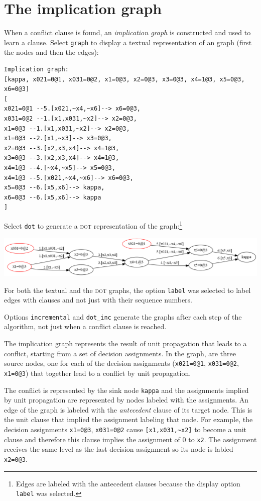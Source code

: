 \documentclass[11pt]{article}
\newcommand*{\p}[1]{\textup{\texttt{#1}}}
\newcommand*{\dt}{\textsc{dot}}
\begin{document}
\clearpage

\section{The implication graph}

When a conflict clause is found, an \emph{implication graph} is
constructed and used to learn a clause. Select \p{graph} to display a
textual representation of an graph (first the nodes and then the edges):
\begin{verbatim}
Implication graph:
[kappa, x021=0@1, x031=0@2, x1=0@3, x2=0@3, x3=0@3, x4=1@3, x5=0@3, x6=0@3]
[
x021=0@1 --5.[x021,~x4,~x6]--> x6=0@3,
x031=0@2 --1.[x1,x031,~x2]--> x2=0@3,
x1=0@3 --1.[x1,x031,~x2]--> x2=0@3,
x1=0@3 --2.[x1,~x3]--> x3=0@3,
x2=0@3 --3.[x2,x3,x4]--> x4=1@3,
x3=0@3 --3.[x2,x3,x4]--> x4=1@3,
x4=1@3 --4.[~x4,~x5]--> x5=0@3,
x4=1@3 --5.[x021,~x4,~x6]--> x6=0@3,
x5=0@3 --6.[x5,x6]--> kappa,
x6=0@3 --6.[x5,x6]--> kappa
]
\end{verbatim}

Select \p{dot} to generate a \dt{} representation of the
graph:\footnote{Edges are labeled with the antecedent clauses because
the display option \p{label} was selected.}

\begin{center}
\includegraphics[keepaspectratio=true,width=\textwidth]{graph}
\end{center}

For both the textual and the \dt{} graphs, the option \p{label} was
selected to label edges with clauses and not just with their sequence
numbers.

Options \p{incremental} and \p{dot\_inc} generate the graphs after each
step of the algorithm, not just when a conflict clause is reached.

The implication graph represents the result of unit propagation that
leads to a conflict, starting from a set of decision assignments. In the
graph, are three source nodes, one for each of the decision assignments
(\p{x021=0@1}, \p{x031=0@2}, \p{x1=0@3}) that together lead to a
conflict by unit propagation.

The conflict is represented by the sink node \p{kappa} and the
assignments implied by unit propagation are represented by nodes labeled
with the assignments. An edge of the graph is labeled with the
\emph{antecedent} clause of its target node. This is the unit clause
that implied the assignment labeling that node. For example, the
decision assignments \p{x1=0@3}, \p{x031=0@2} cause \verb+[x1,x031,~x2]+
to become a unit clause and therefore this clause implies the assignment
of 0 to \p{x2}. The assignment receives the same level as the last
decision assignment so its node is labled \p{x2=0@3}.
\end{document}
